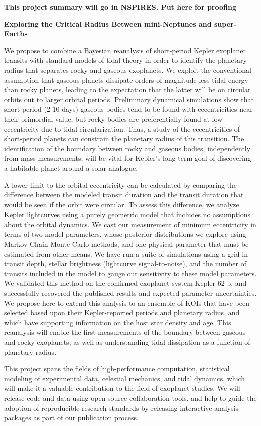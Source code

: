 \centerline{\bf This project summary will go in NSPIRES.  Put here for proofing} \medskip

\centerline{\bf Exploring the Critical Radius Between mini-Neptunes and super-Earths} \medskip

We propose to combine a Bayesian reanalysis of short-period Kepler
exoplanet transits with standard models of tidal theory in order to
identify the planetary radius that separates rocky and gaseous
exoplanets. We exploit the conventional assumption that gaseous
planets dissipate orders of magnitude less tidal energy than rocky
planets, leading to the expectation that the latter will be on
circular orbits out to larger orbital periods. Preliminary dynamical
simulations show that short period (2-10 days) gaseous bodies tend to
be found with eccentricities near their primordial value, but rocky
bodies are preferentially found at low eccentricity due to tidal
circularization.  Thus, a study of the eccentricities of short-period
planets can constrain the planetary radius of this transition.  The
identification of the boundary between rocky and gaseous bodies,
independently from mass measurements, will be vital for Kepler's
long-term goal of discovering a habitable planet around a solar
analogue.

A lower limit to the orbital eccentricity can be calculated by
comparing the difference between the modeled transit duration and the
transit duration that would be seen if the orbit were circular.  To
assess this difference, we analyze Kepler lightcurves using a purely
geometric model that includes no assumptions about the orbital
dynamics.  We cast our measurement of minimum eccentricity in terms of
two model parameters, whose posterior distributions we explore using
Markov Chain Monte Carlo methods, and one physical parameter that must
be estimated from other means.  We have run a suite of simulations
using a grid in transit depth, stellar brightness (lightcurve
signal-to-noise), and the number of transits included in the model to
gauge our sensitivity to these model parameters.
%
%
We validated this method on the confirmed exoplanet system Kepler
62-b, and successfully recovered the published results and expected
parameter uncertainties. We propose here to extend this analysis to an
ensemble of KOIs that have been selected based upon their
Kepler-reported periods and planetary radius, and which have
supporting information on the host star density and age.  This
reanalysis will enable the first measurements of the boundary between
gaseous and rocky exoplanets, as well as understanding tidal
dissipation as a function of planetary radius.

This project spans the fields of high-performance computation,
statistical modeling of experimental data, celestial mechanics, and
tidal dynamics, which will make it a valuable contribution to the
field of exoplanet studies.  We will release code and data using
open-source collaboration tools, and help to guide the adoption of
reproducible research standards by releasing interactive analysis
packages as part of our publication process.

